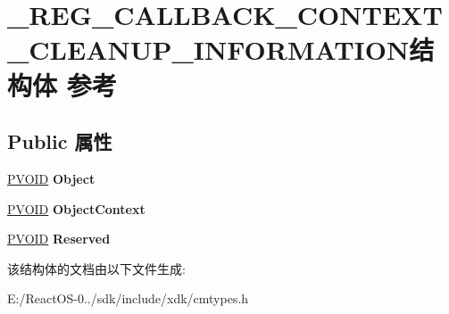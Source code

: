 \hypertarget{struct___r_e_g___c_a_l_l_b_a_c_k___c_o_n_t_e_x_t___c_l_e_a_n_u_p___i_n_f_o_r_m_a_t_i_o_n}{}\section{\+\_\+\+R\+E\+G\+\_\+\+C\+A\+L\+L\+B\+A\+C\+K\+\_\+\+C\+O\+N\+T\+E\+X\+T\+\_\+\+C\+L\+E\+A\+N\+U\+P\+\_\+\+I\+N\+F\+O\+R\+M\+A\+T\+I\+O\+N结构体 参考}
\label{struct___r_e_g___c_a_l_l_b_a_c_k___c_o_n_t_e_x_t___c_l_e_a_n_u_p___i_n_f_o_r_m_a_t_i_o_n}
\subsection*{Public 属性}
\begin{DoxyCompactItemize}
\item 
\mbox{\label{struct___r_e_g___c_a_l_l_b_a_c_k___c_o_n_t_e_x_t___c_l_e_a_n_u_p___i_n_f_o_r_m_a_t_i_o_n_a83c574763a2dd87f4fe8409e3b4fdf91}} 
\hyperlink{interfacevoid}{P\+V\+O\+ID} {\bfseries Object}
\item 
\mbox{\label{struct___r_e_g___c_a_l_l_b_a_c_k___c_o_n_t_e_x_t___c_l_e_a_n_u_p___i_n_f_o_r_m_a_t_i_o_n_a9f92f7979c97be9bcc3d061457ac3bcf}} 
\hyperlink{interfacevoid}{P\+V\+O\+ID} {\bfseries Object\+Context}
\item 
\mbox{\label{struct___r_e_g___c_a_l_l_b_a_c_k___c_o_n_t_e_x_t___c_l_e_a_n_u_p___i_n_f_o_r_m_a_t_i_o_n_ac8df4607afc6c233bd91874709425d1a}} 
\hyperlink{interfacevoid}{P\+V\+O\+ID} {\bfseries Reserved}
\end{DoxyCompactItemize}


该结构体的文档由以下文件生成\+:\begin{DoxyCompactItemize}
\item 
E\+:/\+React\+O\+S-\/0../sdk/include/xdk/cmtypes.\+h\end{DoxyCompactItemize}
